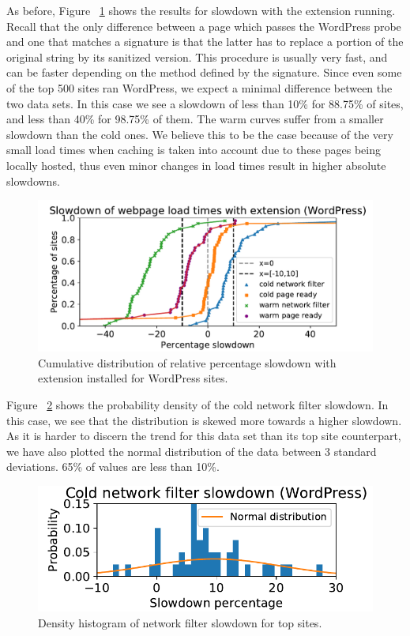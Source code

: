 As before, Figure ~\ref{fig:wordpress_slowdown} shows the results for slowdown with the extension running. Recall that the only difference between a page which passes the WordPress probe and one that matches a signature is that the latter has to replace a portion of the original string by its sanitized version. This procedure is usually very fast, and can be faster depending on the method defined by the signature. Since even some of the top 500 sites ran WordPress, we expect a minimal difference between the two data sets. In this case we see a slowdown of less than 10\% for 88.75\% of sites, and less than 40\% for 98.75\% of them. The warm curves suffer from a smaller slowdown than the cold ones. We believe this to be the case because of the very small load times when caching is taken into account due to these pages being locally hosted, thus even minor changes in load times result in higher absolute slowdowns.

\begin{figure}[h]
	\includegraphics[scale=0.5]{results/extension_slowdown_wordpress_small.pdf}
	\caption{Cumulative distribution of relative percentage slowdown with extension installed for WordPress sites.}
	\label{fig:wordpress_slowdown}
\end{figure}

Figure ~\ref{fig:histogram_slowdown_wordpress} shows the probability density of the cold network filter slowdown. In this case, we see that the distribution is skewed more towards a higher slowdown. As it is harder to discern the trend for this data set than its top site counterpart, we have also plotted the normal distribution of the data between 3 standard deviations. 65\% of values are less than 10\%.

\begin{figure}[h]
	\includegraphics[scale=0.5]{results/density_histogram_filter_slowdown_wordpress_small.pdf}
	\caption{Density histogram of network filter slowdown for top sites.}
	\label{fig:histogram_slowdown_wordpress}
\end{figure}


